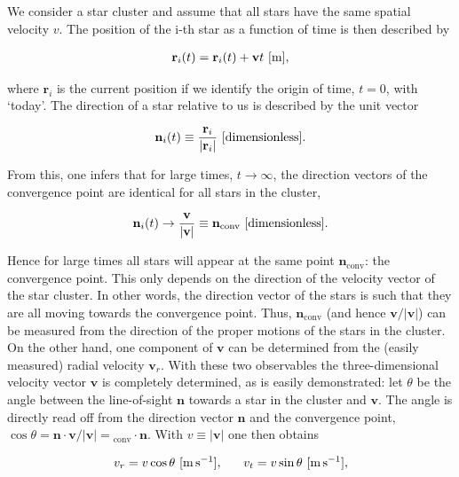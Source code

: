 \documentclass[a4paper,11pt]{article}
\begin{document}
{\noindent}We consider a star cluster and assume that all stars have the same spatial velocity $v$. The position of the i-th star as a function of time is then described by

\begin{align*}
    \mathbf{r}_i(t) = \mathbf{r}_i(t) + \mathbf{v}t ~ [{\rm m}],
\end{align*}

{\noindent}where $\mathbf{r}_i$ is the current position if we identify the origin of time, $t=0$, with `today'. The direction of a star relative to us is described by the unit vector

\begin{align*}
    \mathbf{n}_i(t) \equiv \frac{\mathbf{r}_i}{\lvert\mathbf{r}_i\rvert} ~ [{\rm dimensionless}].
\end{align*}

{\noindent}From this, one infers that for large times, $t\rightarrow\infty$, the direction vectors of the convergence point are identical for all stars in the cluster,

\begin{align*}
    \mathbf{n}_i(t) \rightarrow \frac{\mathbf{v}}{\lvert\mathbf{v}\rvert} \equiv \mathbf{n}_\mathrm{conv} ~ [{\rm dimensionless}].
\end{align*}

{\noindent}Hence for large times all stars will appear at the same point $\mathbf{n}_\mathrm{conv}$: the convergence point. This only depends on the direction of the velocity vector of the star cluster. In other words, the direction vector of the stars is such that they are all moving towards the convergence point. Thus, $\mathbf{n}_\mathrm{conv}$ (and hence $\mathbf{v}/\lvert\mathbf{v}\rvert$) can be measured from the direction of the proper motions of the stars in the cluster. On the other hand, one component of $\mathbf{v}$ can be determined from the (easily measured) radial velocity $\mathbf{v}_r$. With these two observables the three-dimensional velocity vector $\mathbf{v}$ is completely determined, as is easily demonstrated: let $\theta$ be the angle between the line-of-sight $\mathbf{n}$ towards a star in the cluster and $\mathbf{v}$. The angle is directly read off from the direction vector $\mathbf{n}$ and the convergence point, $\cos\theta = \mathbf{n}\cdot\mathbf{v}/\lvert\mathbf{v}\rvert = \mathbf{}_\mathrm{conv}\cdot\mathbf{n}$. With $v\equiv\lvert\mathbf{v}\rvert$ one then obtains

\begin{align*}
    v_r = v\cos\theta ~ [{\rm m\,s^{-1}}], ~~~~~ v_t = v\sin\theta ~ [{\rm m\,s^{-1}}],
\end{align*}
\end{document}
